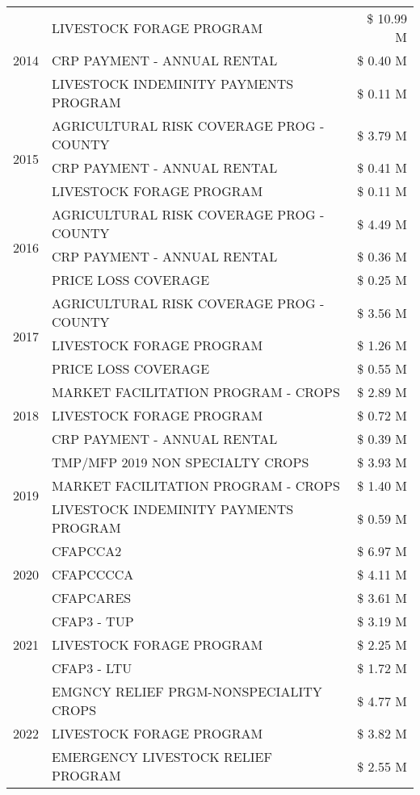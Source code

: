 \begin{tabular}{llr}
\cline{1-3}
\multirow[t]{3}{*}{2014} & LIVESTOCK FORAGE PROGRAM & \$ 10.99 M \\
 & CRP PAYMENT - ANNUAL RENTAL & \$ 0.40 M \\
 & LIVESTOCK INDEMINITY PAYMENTS PROGRAM & \$ 0.11 M \\
\cline{1-3}
\multirow[t]{3}{*}{2015} & AGRICULTURAL RISK COVERAGE PROG - COUNTY & \$ 3.79 M \\
 & CRP PAYMENT - ANNUAL RENTAL & \$ 0.41 M \\
 & LIVESTOCK FORAGE PROGRAM & \$ 0.11 M \\
\cline{1-3}
\multirow[t]{3}{*}{2016} & AGRICULTURAL RISK COVERAGE PROG - COUNTY & \$ 4.49 M \\
 & CRP PAYMENT - ANNUAL RENTAL & \$ 0.36 M \\
 & PRICE LOSS COVERAGE & \$ 0.25 M \\
\cline{1-3}
\multirow[t]{3}{*}{2017} & AGRICULTURAL RISK COVERAGE PROG - COUNTY & \$ 3.56 M \\
 & LIVESTOCK FORAGE PROGRAM & \$ 1.26 M \\
 & PRICE LOSS COVERAGE & \$ 0.55 M \\
\cline{1-3}
\multirow[t]{3}{*}{2018} & MARKET FACILITATION PROGRAM - CROPS & \$ 2.89 M \\
 & LIVESTOCK FORAGE PROGRAM & \$ 0.72 M \\
 & CRP PAYMENT - ANNUAL RENTAL & \$ 0.39 M \\
\cline{1-3}
\multirow[t]{3}{*}{2019} & TMP/MFP 2019 NON SPECIALTY CROPS & \$ 3.93 M \\
 & MARKET FACILITATION PROGRAM - CROPS & \$ 1.40 M \\
 & LIVESTOCK INDEMINITY PAYMENTS PROGRAM & \$ 0.59 M \\
\cline{1-3}
\multirow[t]{3}{*}{2020} & CFAPCCA2 & \$ 6.97 M \\
 & CFAPCCCCA & \$ 4.11 M \\
 & CFAPCARES & \$ 3.61 M \\
\cline{1-3}
\multirow[t]{3}{*}{2021} & CFAP3 - TUP & \$ 3.19 M \\
 & LIVESTOCK FORAGE PROGRAM & \$ 2.25 M \\
 & CFAP3 - LTU & \$ 1.72 M \\
\cline{1-3}
\multirow[t]{3}{*}{2022} & EMGNCY RELIEF PRGM-NONSPECIALITY CROPS & \$ 4.77 M \\
 & LIVESTOCK FORAGE PROGRAM & \$ 3.82 M \\
 & EMERGENCY LIVESTOCK RELIEF PROGRAM & \$ 2.55 M \\
\cline{1-3}
\bottomrule
\end{tabular}
